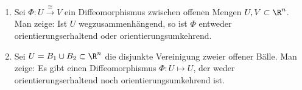             \begin{prob}
%
\begin{enumerate}[label = (\alph*)]
	\item Sei $\Phi \colon U \stackrel{\cong} \longrightarrow V$ ein Diffeomorphismus zwischen offenen Mengen $U, V \subset \R^n$. Man zeige: Ist $U$ wegzusammenh\"angend, so ist $\Phi$ entweder orientierungserhaltend oder orientierungsumkehrend.
	\item Sei $U=B_1\cup B_2\subset\R^n$ die disjunkte Vereinigung zweier offener B\"alle. Man zeige: Es gibt einen Diffeomorphismus $\Phi \colon U \mapsto U$, der weder orientierungserhaltend noch orientierungsumkehrend ist.
\end{enumerate}

\newpage
\vspace{2mm}
            \end{prob}
